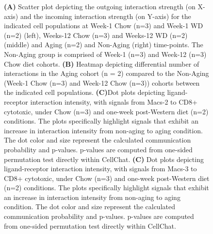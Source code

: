 \begin{figure}[!t]
{    \textbf{(A)} Scatter plot depicting the outgoing interaction strength (on X-axis) and the incoming interaction strength (on Y-axis) for the indicated cell populations at Week-1 Chow (n=3) and Week-1 WD (n=2) (left), Weeks-12 Chow (n=3) and Weeks-12 WD (n=2) (middle) and Aging (n=2) and Non-Aging (right) time-points. The Non-Aging group is comprised of Week-1 (n=3) and Week-12 (n=3) Chow diet cohorts. \textbf{(B)} Heatmap depicting differential number of interactions in the Aging cohort (n = 2) compared to the Non-Aging (Week-1 Chow (n=3) and Week-12 Chow (n=3)) cohorts between the indicated cell populations. \textbf{(C)}Dot plots depicting ligand-receptor interaction intensity, with signals from Macs-2 to CD8+ cytotoxic, under Chow (n=3) and one-week post-Western diet (n=2) conditions. The plots specifically highlight signals that exhibit an increase in interaction intensity from non-aging to aging condition. The dot color and size represent the calculated communication probability and p-values. p-values are computed from one-sided permutation test directly within CellChat. \textbf{(C)} Dot plots depicting ligand-receptor interaction intensity, with signals from Macs-3 to CD8+ cytotoxic, under Chow (n=3) and one-week post-Western diet (n=2) conditions. The plots specifically highlight signals that exhibit an increase in interaction intensity from non-aging to aging condition. The dot color and size represent the calculated communication probability and p-values. p-values are computed from one-sided permutation test directly within CellChat.}
    \label{suppl_fig:cell_cell1}
\end{figure}

